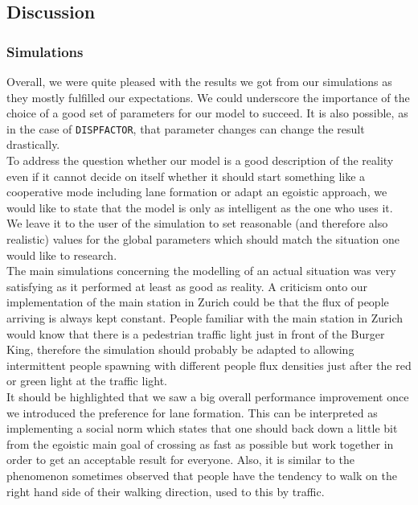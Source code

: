 \subsection{Discussion}
\subsubsection{Simulations}
Overall, we were quite pleased with the results we got from our simulations as they mostly fulfilled our expectations. We could underscore the importance of the choice of a good set of parameters for our model to succeed. It is also possible, as in the case of \texttt{DISPFACTOR}, that parameter changes can change the result drastically.\\
To address the question whether our model is a good description of the reality even if it cannot decide on itself whether it should start something like a cooperative mode including lane formation or adapt an egoistic approach, we would like to state that the model is only as intelligent as the one who uses it. We leave it to the user of the simulation to set reasonable (and therefore also realistic) values for the global parameters which should match the situation one would like to research.\\

\noi The main simulations concerning the modelling of an actual situation was very satisfying as it performed at least as good as reality. A criticism onto our implementation of the main station in Zurich could be that the flux of people arriving is always kept constant. People familiar with the main station in Zurich would know that there is a pedestrian traffic light just in front of the Burger King, therefore the simulation should probably be adapted to allowing intermittent people spawning with different people flux densities just after the red or green light at the traffic light.\\

\noi It should be highlighted that we saw a big overall performance improvement once we introduced the preference for lane formation. This can be interpreted as implementing a social norm which states that one should back down a little bit from the egoistic main goal of crossing as fast as possible but work together in order to get an acceptable result for everyone. Also, it is similar to the phenomenon sometimes observed that people have the tendency to walk on the right hand side of their walking direction, used to this by traffic.\\


